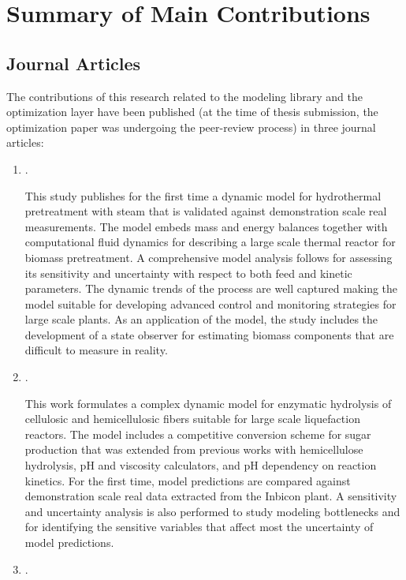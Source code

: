 \chapter{Summary of Main Contributions}
\label{chap:contributions}

\section*{Journal Articles}
The contributions of this research related to the modeling library and the optimization layer have been published (at the time of thesis submission, the optimization paper was undergoing the peer-review process) in three journal articles:
\begin{enumerate}[label=(\Alph*)]
	\item {}.
	
	This study publishes for the first time a dynamic model for hydrothermal pretreatment with steam that is validated against demonstration scale real measurements. The model embeds mass and energy balances together with computational fluid dynamics for describing a large scale thermal reactor for biomass pretreatment. A comprehensive model analysis follows for assessing its sensitivity and uncertainty with respect to both feed and kinetic parameters. The dynamic trends of the process are well captured making the model suitable for developing advanced control and monitoring strategies for large scale plants. As an application of the model, the study includes the development of a state observer for estimating biomass components that are difficult to measure in reality.
	
	\item {}.
	
	This work formulates a complex dynamic model for enzymatic hydrolysis of cellulosic and hemicellulosic fibers suitable for large scale liquefaction reactors. The model includes a competitive conversion scheme for sugar production that was extended from previous works with hemicellulose hydrolysis, pH and viscosity calculators, and pH dependency on reaction kinetics. For the first time, model predictions are compared against demonstration scale real data extracted from the Inbicon plant. A sensitivity and uncertainty analysis is also performed to study modeling bottlenecks and for identifying the sensitive variables that affect most the uncertainty of model predictions.
	
	\item {}.
	

\end{enumerate}

